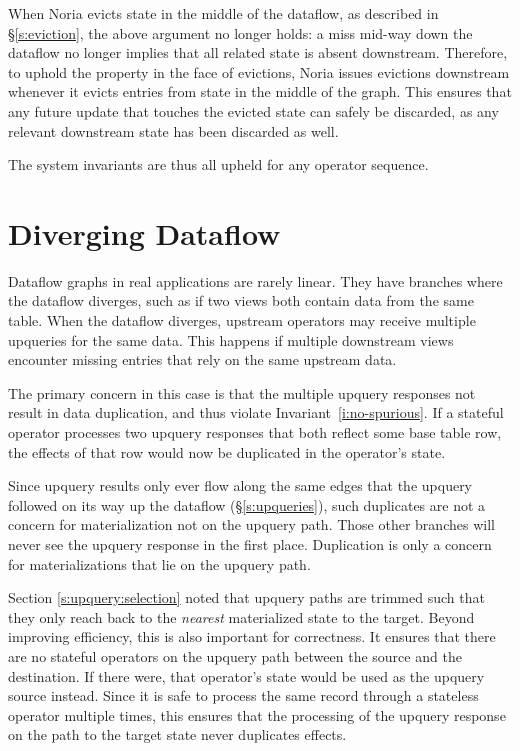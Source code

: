When Noria evicts state in the middle of the dataflow, as described in
\S\ref{s:eviction}, the above argument no longer holds: a miss mid-way down the
dataflow no longer implies that all related state is absent downstream.
Therefore, to uphold the property in the face of evictions, Noria issues
evictions downstream whenever it evicts entries from state in the middle of the
graph. This ensures that any future update that touches the evicted state can
safely be discarded, as any relevant downstream state has been discarded as
well.

The system invariants are thus all upheld for any operator sequence.

\section{Diverging Dataflow}
\label{s:partial:diverging}

Dataflow graphs in real applications are rarely linear. They have branches where
the dataflow diverges, such as if two views both contain data from the same
table. When the dataflow diverges, upstream operators may receive multiple
upqueries for the same data. This happens if multiple downstream views encounter
missing entries that rely on the same upstream data.

The primary concern in this case is that the multiple upquery responses not
result in data duplication, and thus violate Invariant~\ref{i:no-spurious}. If a
stateful operator processes two upquery responses that both reflect some base
table row, the effects of that row would now be duplicated in the operator's
state.

Since upquery results only ever flow along the same edges that the upquery
followed on its way up the dataflow (\S\ref{s:upqueries}), such duplicates are
not a concern for materialization not on the upquery path. Those other branches
will never see the upquery response in the first place. Duplication is only a
concern for materializations that lie on the upquery path.

Section \ref{s:upquery:selection} noted that upquery paths are trimmed such that
they only reach back to the \emph{nearest} materialized state to the target.
Beyond improving efficiency, this is also important for correctness. It ensures
that there are no stateful operators on the upquery path between the source and
the destination. If there were, that operator's state would be used as the
upquery source instead. Since it is safe to process the same record through a
stateless operator multiple times, this ensures that the processing of the
upquery response on the path to the target state never duplicates effects.


